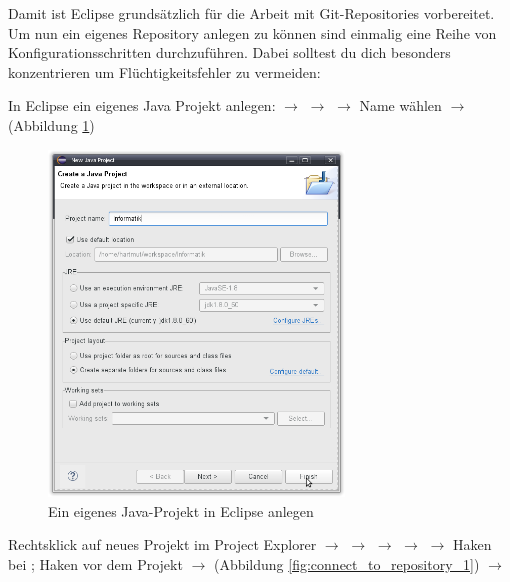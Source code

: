 \afterpage{\clearpage}

Damit ist Eclipse grundsätzlich für die Arbeit mit Git-Repositories vorbereitet.
Um nun ein eigenes Repository anlegen zu können sind einmalig eine Reihe von
Konfigurationsschritten durchzuführen. Dabei solltest du dich besonders
konzentrieren um Flüchtigkeitsfehler zu vermeiden:

\begin{compactenum}
\item In Eclipse ein eigenes Java Projekt anlegen:  $\rightarrow$
 $\rightarrow$  $\rightarrow$ Name wählen
$\rightarrow$  (Abbildung \ref{fig:eclipse-java-project-creation})

\begin{figure}[h]
  \centering
   \includegraphics[width=0.70\textwidth]{./inf/SEKII/01_Vorbereitung/Eclipse-Java-Project-Creation.png}
   \caption{Ein eigenes Java-Projekt in Eclipse anlegen}
   \label{fig:eclipse-java-project-creation}
\end{figure}


\item Rechtsklick auf neues Projekt im Project Explorer $\rightarrow$
 $\rightarrow$  $\rightarrow$ 
$\rightarrow$  $\rightarrow$ Haken bei ; Haken vor dem Projekt $\rightarrow$
 (Abbildung \ref{fig:connect_to_repository_1})
$\rightarrow$ 


\end{compactenum}
